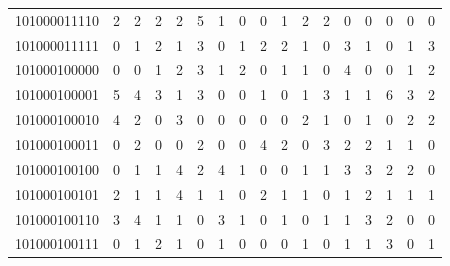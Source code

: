 \documentclass[10pt,a4paper]{article}
\begin{document}
\begin{longtable}{ |c|c|c|c|c|c|c|c|c|c|c|c|c|c|c|c|c| }
    101000011110              & 2                            & 2                                & 2                            & 2                              & 5   & 1   & 0   & 0   & 1   & 2   & 2   & 0   & 0   & 0   & 0   & 0   \\
    101000011111              & 0                            & 1                                & 2                            & 1                              & 3   & 0   & 1   & 2   & 2   & 1   & 0   & 3   & 1   & 0   & 1   & 3   \\
    101000100000              & 0                            & 0                                & 1                            & 2                              & 3   & 1   & 2   & 0   & 1   & 1   & 0   & 4   & 0   & 0   & 1   & 2   \\
    101000100001              & 5                            & 4                                & 3                            & 1                              & 3   & 0   & 0   & 1   & 0   & 1   & 3   & 1   & 1   & 6   & 3   & 2   \\
    101000100010              & 4                            & 2                                & 0                            & 3                              & 0   & 0   & 0   & 0   & 0   & 2   & 1   & 0   & 1   & 0   & 2   & 2   \\
    101000100011              & 0                            & 2                                & 0                            & 0                              & 2   & 0   & 0   & 4   & 2   & 0   & 3   & 2   & 2   & 1   & 1   & 0   \\
    101000100100              & 0                            & 1                                & 1                            & 4                              & 2   & 4   & 1   & 0   & 0   & 1   & 1   & 3   & 3   & 2   & 2   & 0   \\
    101000100101              & 2                            & 1                                & 1                            & 4                              & 1   & 1   & 0   & 2   & 1   & 1   & 0   & 1   & 2   & 1   & 1   & 1   \\
    101000100110              & 3                            & 4                                & 1                            & 1                              & 0   & 3   & 1   & 0   & 1   & 0   & 1   & 1   & 3   & 2   & 0   & 0   \\
    101000100111              & 0                            & 1                                & 2                            & 1                              & 0   & 1   & 0   & 0   & 0   & 1   & 0   & 1   & 1   & 3   & 0   & 1   \\

\end{longtable}
\end{document}

